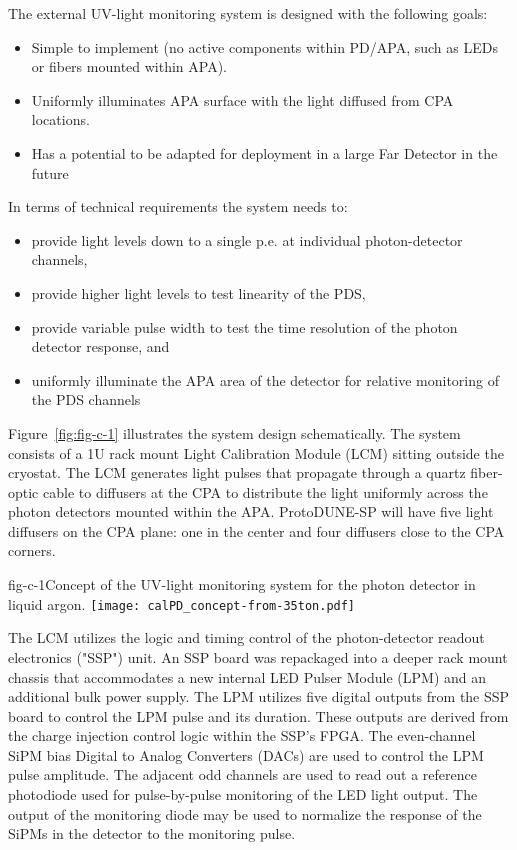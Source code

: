The external UV-light monitoring system is designed with the following goals:
				
\begin{itemize}
\item Simple to implement (no active components within PD/APA, such as LEDs or fibers mounted within APA).
\item Uniformly illuminates APA surface with the light diffused from CPA locations.
\item Has a potential to be adapted for deployment in a large Far Detector in the future
\end{itemize}

In terms of technical requirements the system needs to:
\begin{itemize}
\item provide light levels down to a single p.e. at individual photon-detector channels,
\item provide higher light levels to test linearity of the PDS,
\item provide variable pulse width to test the time resolution of the photon detector response, and
\item uniformly illuminate the APA area of the detector for relative monitoring of the PDS channels
\end{itemize}

Figure~\ref{fig:fig-c-1} illustrates the system design schematically. The system consists of a 1U rack mount Light Calibration Module (LCM) sitting outside the cryostat. The LCM generates light pulses that propagate through a quartz fiber-optic cable to diffusers at the CPA to distribute the light uniformly across the photon detectors mounted within the APA.  ProtoDUNE-SP will have five light 
diffusers on the CPA plane: one in the center and four diffusers close to the CPA corners. 
%
 \begin{cdrfigure}{fig-c-1}{Concept of the UV-light monitoring system for the photon detector in liquid argon.}
\texttt{[image: calPD\_concept-from-35ton.pdf]}
\end{cdrfigure}
%


The LCM utilizes the logic and timing control of the photon-detector readout electronics ("SSP") unit.  
An SSP board was repackaged into a deeper rack mount chassis that accommodates a new internal 
LED Pulser Module (LPM) and an additional bulk power supply. The LPM utilizes five digital outputs from the SSP board to control the LPM pulse and its duration.  
These outputs are derived from the charge injection control logic within the SSP's FPGA.  
The even-channel SiPM bias Digital to Analog Converters (DACs)
are used to control the LPM pulse amplitude.  
The adjacent odd channels are used to read out a reference photodiode used for pulse-by-pulse monitoring of the LED light output.  
The output of the monitoring diode may be used to normalize 
the response of the SiPMs in the detector to the monitoring pulse.


